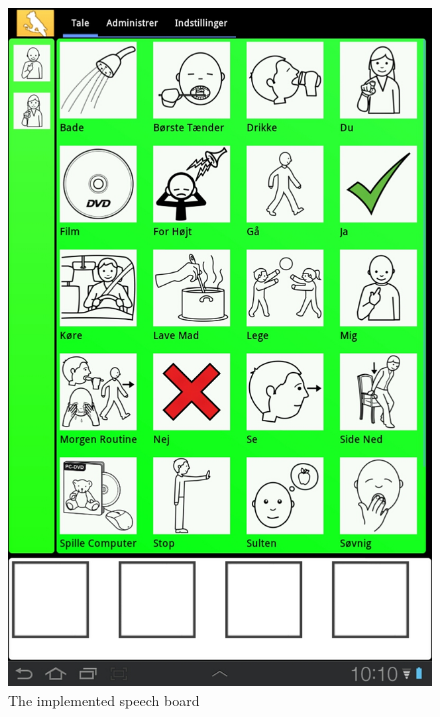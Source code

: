 \begin{figure}
	\centering
		\includegraphics[scale=0.50]{input/images/speech_board.jpg}
	\caption{The implemented speech board}
	\label{fig:speech_board}
\end{figure}

